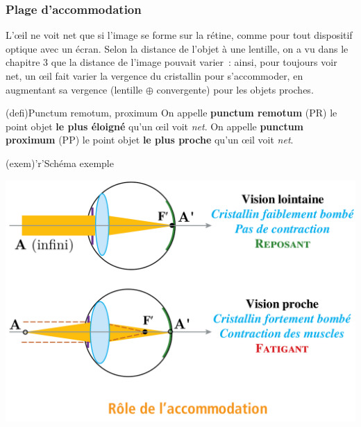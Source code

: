 \documentclass[../../main/main.tex]{subfiles}
\begin{document}
\subsubsection{Plage d'accommodation}
L'œil ne voit net que si l'image se forme sur la rétine, comme pour tout
dispositif optique avec un écran. Selon la distance de l'objet à une
lentille, on a vu dans le chapitre 3 que la distance de l'image pouvait varier~:
ainsi, pour toujours voir net, un œil fait varier la vergence du cristallin pour
s'accommoder, en augmentant sa vergence (lentille $\oplus$ convergente) pour les
objets proches.
\begin{tcbraster}[raster columns=2, raster equal height=rows]
	\begin{tcb}[label=def:pppr](defi){Punctum remotum, proximum}
		On appelle \textbf{punctum remotum} (PR) le point objet \textbf{le plus
			éloigné} qu'un œil voit \textit{net}.
		\tcblower
		On appelle \textbf{punctum proximum} (PP) le point objet \textbf{le plus
			proche} qu'un œil voit \textit{net}.
	\end{tcb}
	\begin{tcb}[width=\linewidth](exem)'r'{Schéma exemple}
		\begin{center}
			\includegraphics[width=\linewidth]{oeil_acco}
			\label{fig:oeil_acco}
		\end{center}
	\end{tcb}
\end{tcbraster}
\end{document}
